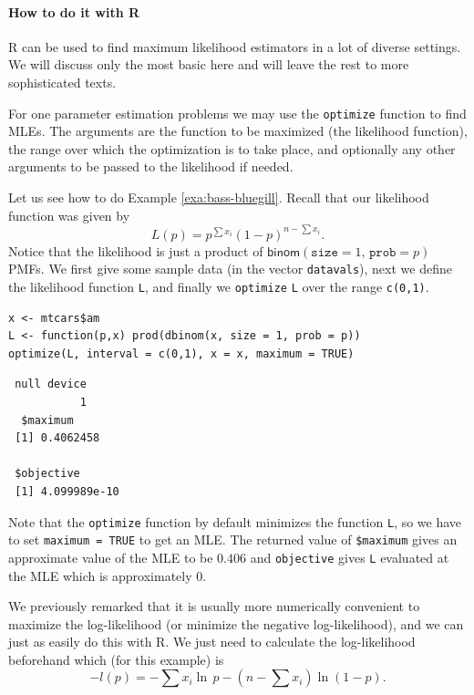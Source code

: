 \documentclass[captions=tableheading]{scrbook}
\begin{document}
\paragraph*{How to do it with \textsf{R}}

\textsf{R} can be used to find maximum likelihood estimators in a lot of diverse settings. We will discuss only the most basic here and will leave the rest to more sophisticated texts.

For one parameter estimation problems we may use the \texttt{optimize} function to find MLEs. The arguments are the function to be maximized (the likelihood function), the range over which the optimization is to take place, and optionally any other arguments to be passed to the likelihood if needed.

Let us see how to do Example \ref{exa:bass-bluegill}. Recall that our likelihood function was given by
\begin{equation}
L(p)=p^{\sum x_{i}}(1-p)^{n-\sum x_{i}}.
\end{equation}
Notice that the likelihood is just a product of \(\mathsf{binom}(\mathtt{size}=1,\,\mathtt{prob}=p)\) PMFs. We first give some sample data (in the vector \texttt{datavals}), next we define the likelihood function \texttt{L}, and finally we \texttt{optimize} \texttt{L} over the range \texttt{c(0,1)}.


\begin{verbatim}
x <- mtcars$am
L <- function(p,x) prod(dbinom(x, size = 1, prob = p))
optimize(L, interval = c(0,1), x = x, maximum = TRUE)
\end{verbatim}

\begin{verbatim}
 null device 
           1
  $maximum
 [1] 0.4062458
 
 $objective
 [1] 4.099989e-10
\end{verbatim}



Note that the \texttt{optimize} function by default minimizes the function \texttt{L}, so we have to set \texttt{maximum = TRUE} to get an MLE. The returned value of \texttt{\$maximum} gives an approximate value of the MLE to be \(  0.406 \) and \texttt{objective} gives \texttt{L} evaluated at the MLE which is approximately \(  0 \).

We previously remarked that it is usually more numerically convenient to maximize the log-likelihood (or minimize the negative log-likelihood), and we can just as easily do this with \textsf{R}. We just need to calculate the log-likelihood beforehand which (for this example) is
\[
-l(p)=-\sum x_{i}\ln\, p-\left(n-\sum x_{i}\right)\ln(1-p).
\]
\end{document}
